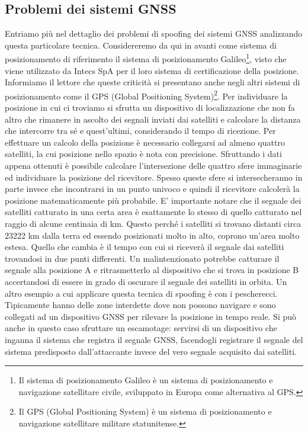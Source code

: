 \subsection{Problemi dei sistemi GNSS}
Entriamo più nel dettaglio dei problemi di spoofing dei sistemi GNSS analizzando questa particolare tecnica. Considereremo da qui in avanti come sistema di posizionamento di riferimento il sistema di posizionamento Galileo\footnote{Il sistema di posizionamento Galileo è un sistema di posizionamento e navigazione satellitare civile, sviluppato in Europa come alternativa al GPS.}, visto che viene utilizzato da Intecs SpA per il loro sistema di certificazione della posizione. Informiamo il lettore che queste criticità si presentano anche negli altri sistemi di posizionamento come il GPS (Global Positioning System)\footnote{Il GPS (Global Positioning System) è un sistema di posizionamento e navigazione satellitare militare statunitense.}. Per individuare la posizione in cui ci troviamo si sfrutta un dispositivo di localizzazione che non fa altro che rimanere in ascolto dei segnali inviati dai satelliti e calcolare la distanza che intercorre tra sé e quest'ultimi, considerando il tempo di ricezione. Per effettuare un calcolo della posizione è necessario collegarsi ad almeno quattro satelliti, la cui posizione nello spazio è nota con precisione. Sfruttando i dati appena ottenuti è possibile calcolare l’intersezione delle quattro sfere immaginarie ed individuare la posizione del ricevitore. Spesso queste sfere si intersecheranno in parte invece che incontrarsi in un punto univoco e quindi il ricevitore calcolerà la posizione matematicamente più probabile. E' importante notare che il segnale dei satelliti catturato in una certa area è esattamente lo stesso di quello catturato nel raggio di alcune centinaia di km. Questo perché i satelliti si trovano distanti circa 23222 km dalla terra ed essendo posizionati molto in alto, coprono un'area molto estesa. Quello che cambia è il tempo con cui si riceverà il segnale dai satelliti trovandosi in due punti differenti. Un malintenzionato potrebbe catturare il segnale alla posizione A e ritrasmetterlo al dispositivo che si trova in posizione B accertandosi di essere in grado di oscurare il segnale dei satelliti in orbita. Un altro esempio a cui applicare questa tecnica di spoofing è con i pescherecci. Tipicamente hanno delle zone interdette dove non possono navigare e sono collegati ad un dispositivo GNSS per rilevare la posizione in tempo reale. Si può anche in questo caso sfruttare un escamotage: servirsi di un dispositivo che inganna il sistema che registra il segnale GNSS, facendogli registrare il segnale del sistema predisposto dall'attaccante invece del vero segnale acquisito dai satelliti.

